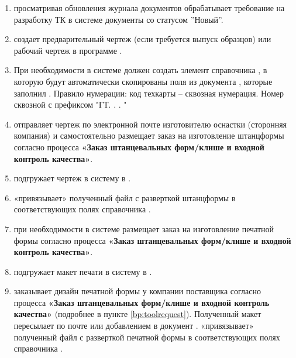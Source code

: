 \begin{enumerate}
\item \tehnolog просматривая обновления журнала документов  обрабатывает требование на разработку ТК в системе \gofro документы со статусом ''Новый''.


\item \tehnolog создает предварительный чертеж (если требуется выпуск образцов) или рабочий чертеж в программе \blue{\@AutoCad}.
\item	При необходимости \tehnolog в системе \gofro должен создать элемент справочника , в которую будут автоматически скопированы поля из документа , которые заполнил \manager. Правило нумерации: код техкарты – сквозная нумерация. Номер сквозной с префиксом "ГТ. . . "


\item \tehnolog 
отправляет чертеж по электронной почте изготовителю оснастки (сторонняя компания) и самостоятельно размещает заказ на изготовление штанцформы согласно процесса \textbf{«Заказ штанцевальных форм/клише и входной контроль качества»}. 

\item \tehnolog подгружает чертеж в систему \gofro в .

\item \tehnolog «привязывает» полученный файл с разверткой штанцформы в соответствующих полях справочника .

\item \manager при необходимости в системе \gofro размещает заказ на изготовление печатной формы согласно процесса \textbf{«Заказ штанцевальных форм/клише и входной контроль качества»}. 


\item \tehnolog подгружает макет печати в систему \gofro в .

\item	\manager заказывает дизайн печатной формы у компании поставщика согласно процесса \textbf{«Заказ штанцевальных форм/клише и входной контроль качества»} (подробнее в пункте \ref{bp:toolrequest}). Полученный макет \manager пересылает \tehnolog по почте или добавлением в документ .
\tehnolog «привязывает» полученный файл с разверткой печатной формы в соответствующих полях справочника . 


\end{enumerate}
